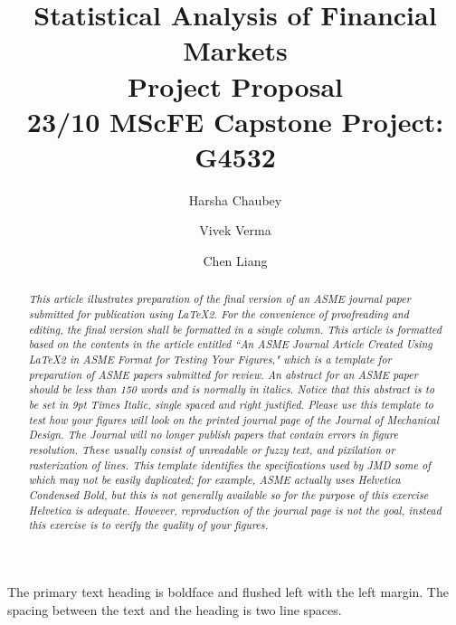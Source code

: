 \documentclass[12pt]{asme2ej}
\title{Statistical Analysis of Financial Markets\\
Project Proposal\\
23/10 MScFE Capstone Project: G4532}
\author{Harsha Chaubey
\affiliation{
    United Kingdom\\
    harshachaube@gmail.com
}
}
\author{Vivek Verma
\affiliation{
    Canada\\
    vivektheintel@gmail.com
}
}
\author{Chen Liang
\affiliation{
    United States of America\\
    landseer92@gmail.com
}
}
\begin{document}
    \maketitle

    \begin{abstract}
    {\it
    This article illustrates preparation of the final version of
    an ASME journal paper submitted for publication using
    \LaTeX2\raisebox{-.3ex}{$\epsilon$}. For the convenience of proofreading
    and editing, the final version shall be formatted in a single column.
    This article is formatted based on the contents in the article
    entitled ``{\rm An ASME Journal Article Created Using
    \LaTeX2\raisebox{-.3ex}{$\epsilon$} in ASME Format for
    Testing Your Figures,}" which is a template for
    preparation of ASME papers submitted for review.
    An abstract for an ASME paper should be less than 150 words and is normally in italics. Notice that this abstract is to be set in 9pt Times Italic, single spaced and right justified.
    Please use this template to test how your figures will look on the printed journal page of the Journal of Mechanical Design. The Journal will no longer publish papers that contain errors in figure resolution. These usually consist of unreadable or fuzzy text, and pixilation or rasterization of lines. This template identifies the specifications used by JMD some of which may not be easily duplicated; for example, ASME actually uses Helvetica Condensed Bold, but this is not generally available so for the purpose of this exercise Helvetica is adequate. However, reproduction of the journal page is not the goal, instead this exercise is to verify the quality of your figures.
    }
    \end{abstract}

    \begin{nomenclature}
    \end{nomenclature}

    The primary text heading is boldface and flushed left with the left margin. The spacing between the text and the heading is two line spaces.

\end{document}
